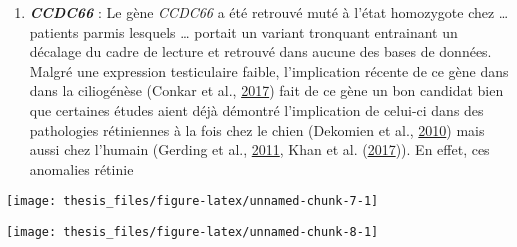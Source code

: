\documentclass[12pt,twoside]{reedthesis}
\providecommand{\tightlist}{%
  \setlength{\itemsep}{0pt}\setlength{\parskip}{0pt}}
\theoremstyle{definition}
\theoremstyle{definition}
\theoremstyle{remark}
\begin{document}
  \begin{enumerate}
  \def\labelenumi{\arabic{enumi}.}
  \tightlist
  \item
    \textbf{\emph{CCDC66}} : Le gène \emph{CCDC66} a été retrouvé muté à
    l'état homozygote chez \ldots{} patients parmis lesquels \ldots{}
    portait un variant tronquant entrainant un décalage du cadre de
    lecture et retrouvé dans aucune des bases de données. Malgré une
    expression testiculaire faible, l'implication récente de ce gène dans
    dans la ciliogénèse (Conkar et al.,
    \protect\hyperlink{ref-Conkar2017}{2017}) fait de ce gène un bon
    candidat bien que certaines études aient déjà démontré l'implication
    de celui-ci dans des pathologies rétiniennes à la fois chez le chien
    (Dekomien et al., \protect\hyperlink{ref-Dekomien2010}{2010}) mais
    aussi chez l'humain (Gerding et al.,
    \protect\hyperlink{ref-Gerding2011}{2011}, Khan et al.
    (\protect\hyperlink{ref-Khan2017}{2017})). En effet, ces anomalies
    rétinie
  \end{enumerate}
  
  \newpage
  
  \begin{center}\texttt{[image: thesis\_files/figure-latex/unnamed-chunk-7-1]} \end{center}
  
  \newpage
  
  \begin{center}\texttt{[image: thesis\_files/figure-latex/unnamed-chunk-8-1]} \end{center}
  
  \newpage
  
\end{document}
